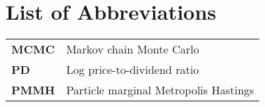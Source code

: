 \chapter{List of Abbreviations}
\begin{tabular}{ll}
\textbf{MCMC} & Markov chain Monte Carlo \\
\textbf{PD} & Log price-to-dividend ratio \\
\textbf{PMMH} & Particle marginal Metropolis Hastings \\
\end{tabular}
